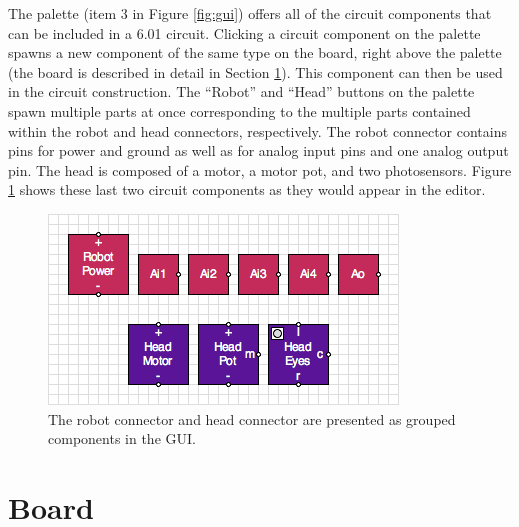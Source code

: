 The palette (item $3$ in Figure \ref{fig:gui}) offers all of the circuit
components that can be included in a 6.01 circuit.
Clicking a circuit component on
the palette spawns a new component of the same type on the board, right above
the palette (the board is described in detail in Section \ref{sec:board}).
This component can then be used in the circuit construction. The
``Robot'' and ``Head'' buttons on the palette spawn multiple parts at once
corresponding to the multiple parts contained within the robot and head
connectors, respectively. The robot
connector contains pins for power and ground as well as for analog input pins
and one analog output pin. The head is composed of a motor, a motor pot, and
two photosensors. Figure \ref{fig:robot_head_parts} shows these last two
circuit components as they would appear in the editor.

\begin{figure}
\begin{center}
\includegraphics[scale=0.75]{Images/robot_head_parts.png}
\caption[Grouped components]{The robot connector and head connector are
presented as grouped components in the GUI.}
\label{fig:robot_head_parts}
\end{center}
\end{figure}

\section{Board}
\label{sec:board}

